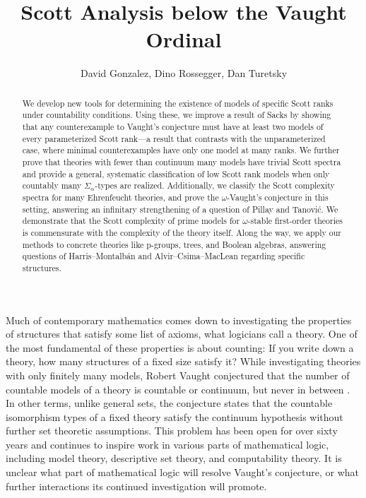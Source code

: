 \documentclass{amsart}
\title{Scott Analysis below the Vaught Ordinal}
\author{David Gonzalez, Dino Rossegger, Dan Turetsky}
\renewcommand{\-}{\text{-}}
\begin{document}
\begin{abstract}
We develop new tools for determining the existence of models of specific Scott ranks under countability conditions. Using these, we improve a result of Sacks by showing that any counterexample to Vaught’s conjecture must have at least two models of every parameterized Scott rank—a result that contrasts with the unparameterized case, where minimal counterexamples have only one model at many ranks. We further prove that theories with fewer than continuum many models have trivial Scott spectra and provide a general, systematic classification of low Scott rank models when only countably many $\Sigma_\alpha$-types are realized. Additionally, we classify the Scott complexity spectra for many Ehrenfeucht theories, and prove the $\omega$-Vaught’s conjecture in this setting, answering an infinitary strengthening of a question of Pillay and Tanović. We demonstrate that the Scott complexity of prime models for $\omega$-stable first-order theories is commensurate with the complexity of the theory itself. Along the way, we apply our methods to concrete theories like p-groups, trees, and Boolean algebras, answering questions of Harris--Montalbán and Alvir--Csima--MacLean regarding specific structures.
\end{abstract}
\maketitle
Much of contemporary mathematics comes down to investigating the properties of structures that satisfy some list of axioms, what logicians call a theory.
One of the most fundamental of these properties is about counting:
If you write down a theory, how many structures of a fixed size satisfy it?
While investigating theories with only finitely many models, Robert Vaught conjectured that the number of countable models of a theory is countable or continuum, but never in between \cite{Vau61}.
In other terms, unlike general sets, the conjecture states that the countable isomorphism types of a fixed theory satisfy the continuum hypothesis without further set theoretic assumptions.
This problem has been open for over sixty years and continues to inspire work in various parts of mathematical logic, including model theory, descriptive set theory, and computability theory.
It is unclear what part of mathematical logic will resolve Vaught's conjecture, or what further interactions its continued investigation will promote.
\end{document}
